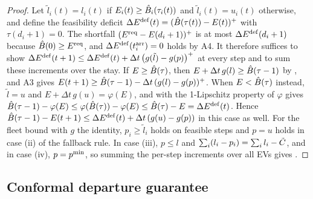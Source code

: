 \begin{proof}
Let $\tilde l_i(t)=l_i(t)$ if $E_i(t)\ge\hat B_i(\tau_i(t))$ and $\tilde l_i(t)=u_i(t)$ otherwise, and define the feasibility deficit $\Delta E^{\mathrm{def}}(t)=(\hat B(\tau(t))-E(t))^{+}$ with $\tau(d_i+1)=0$.
The shortfall $(E^{\mathrm{req}}-E(d_i+1))^{+}$ is at most $\Delta E^{\mathrm{def}}(d_i+1)$ because $\hat B(0)\ge E^{\mathrm{req}}$, and $\Delta E^{\mathrm{def}}(t_i^{\mathrm{arr}})=0$ holds by A4.
It therefore suffices to show $\Delta E^{\mathrm{def}}(t+1)\le\Delta E^{\mathrm{def}}(t)+\Delta t\,\big(g(\tilde l)-g(p)\big)^{+}$ at every step and to sum these increments over the stay.
If $E\ge\hat B(\tau)$, then $E+\Delta t\,g(l)\ge\hat B(\tau-1)$ by , and A3 gives $E(t+1)\ge\hat B(\tau-1)-\Delta t\,(g(l)-g(p))^{+}$.
When $E<\hat B(\tau)$ instead, $\tilde l=u$ and $E+\Delta t\,g(u)=\varphi(E)$, and  with the 1-Lipschitz property of $\varphi$ gives $\hat B(\tau-1)-\varphi(E)\le\varphi(\hat B(\tau))-\varphi(E)\le\hat B(\tau)-E=\Delta E^{\mathrm{def}}(t)$.
Hence $\hat B(\tau-1)-E(t+1)\le\Delta E^{\mathrm{def}}(t)+\Delta t\,(g(u)-g(p))$ in this case as well.
For the fleet bound with $g$ the identity, $p_i\ge\tilde l_i$ holds on feasible steps and $p=u$ holds in case (ii) of the fallback rule.
In case (iii), $p\le l$ and $\sum_i(l_i-p_i)=\sum_il_i-\tilde C$, and in case (iv), $p=p^{\min}$, so summing the per-step increments over all EVs gives .
\end{proof}

\subsection{Conformal departure guarantee}\label{app:conformal}

